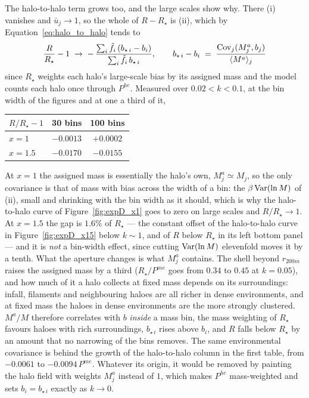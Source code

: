 \documentclass{article}
\begin{document}
The halo-to-halo term grows too, and the large scales show why. There (i)
vanishes and $\bar u_j \to 1$, so the whole of $R - R_\star$ is (ii), which by
Equation~\eqref{eq:halo_to_halo} tends to
\begin{equation}
  \frac{R}{R_\star} - 1 \;\to\; -\,\frac{\sum_i \tilde f_i\,
  (b_{\star\,i} - b_i)}{\sum_i \tilde f_i\, b_{\star\,i}},
  \qquad
  b_{\star\,i} - b_i \;=\; \frac{{\rm Cov}_j(M_j^a, b_j)}{\langle M^a\rangle_j}
\end{equation}
since $R_\star$ weights each halo's large-scale bias by its assigned mass and
the model counts each halo once through $P^{he}$. Measured over $0.02 < k <
0.1$, at the bin width of the figures and at one a third of it,
\begin{center}
\renewcommand{\arraystretch}{1.2}
\begin{tabular}{lcc}
\hline
$R/R_\star - 1$ & 30 bins & 100 bins \\
\hline
$x = 1$   & $-0.0013$ & $+0.0002$ \\
$x = 1.5$ & $-0.0170$ & $-0.0155$ \\
\hline
\end{tabular}
\end{center}
At $x = 1$ the assigned mass is essentially the halo's own, $M_j^a \simeq
M_j$, so the only covariance is that of mass with bias across the width of a
bin: the $\beta\,{\rm Var}(\ln M)$ of (ii), small and shrinking with the bin
width as it should, which is why the halo-to-halo curve of
Figure~\ref{fig:expD_x1} goes to zero on large scales and $R/R_\star \to 1$.
At $x = 1.5$ the gap is $1.6\%$ of $R_\star$ --- the constant offset of the
halo-to-halo curve in Figure~\ref{fig:expD_x15} below $k\sim1$, and of $R$
below $R_\star$ in its left bottom panel --- and it is \emph{not} a bin-width
effect, since cutting ${\rm Var}(\ln M)$ elevenfold moves it by a tenth. What
the aperture changes is what $M_j^a$ contains. The shell beyond $r_{200m}$
raises the assigned mass by a third ($R_\star/P^{me}$ goes from $0.34$ to
$0.45$ at $k = 0.05$), and how much of it a halo collects at fixed mass depends
on its surroundings: infall, filaments and neighbouring haloes are all richer
in dense environments, and at fixed mass the haloes in dense environments are
the more strongly clustered. $M^a/M$ therefore correlates with $b$ \emph{inside}
a mass bin, the mass weighting of $R_\star$ favours haloes with rich
surroundings, $b_{\star\,i}$ rises above $b_i$, and $R$ falls below $R_\star$ by
an amount that no narrowing of the bins removes. The same environmental
covariance is behind the growth of the halo-to-halo column in the first table,
from $-0.0061$ to $-0.0094\,P^{me}$. Whatever its origin, it would be removed
by painting the halo field with weights $M_j^a$ instead of $1$, which makes
$P^{he}$ mass-weighted and sets $b_i = b_{\star\,i}$ exactly as $k\to0$.
\end{document}

